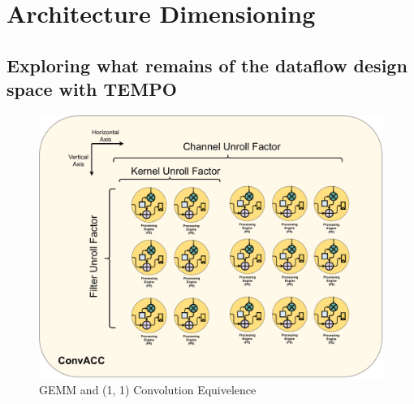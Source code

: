 \chapter{Architecture Dimensioning}
\label{chap:arch_dimensioning}

\section{Exploring what remains of the dataflow design space with TEMPO}
\label{chap:dataflow_dse:exploring}

\begin{figure}[]
    \centering
    \includegraphics[scale=0.4]{fig/axis_mapping.pdf}
    \caption{\ac{GEMM} and (1, 1) Convolution Equivelence}
    \label{fig:axis_mapping}
\end{figure}

